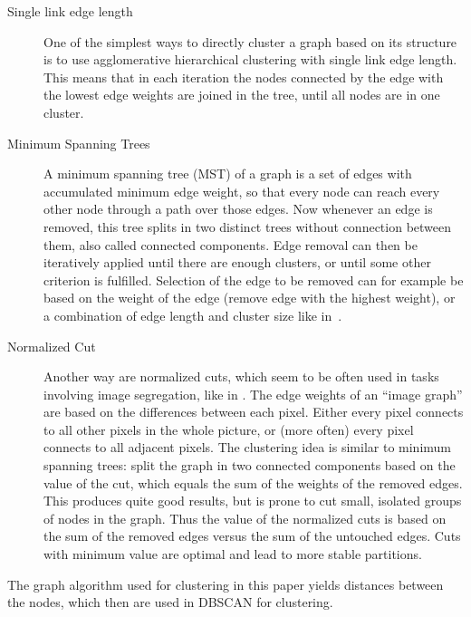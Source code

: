 \begin{description}
\item[Single link edge length] One of the simplest ways to directly cluster a graph based on its structure is to use agglomerative hierarchical clustering with single link edge length. This means that in each iteration the nodes connected by the edge with the lowest edge weights are joined in the tree, until all nodes are in one cluster.

\item[Minimum Spanning Trees]
A minimum spanning tree (MST) of a graph is a set of edges with accumulated minimum edge weight, so that every node can reach every other node through a path over those edges. Now whenever an edge is removed, this tree splits in two distinct trees without connection between them, also called connected components. Edge removal can then be iteratively applied until there are enough clusters, or until some other criterion is fulfilled. Selection of the edge to be removed can for example be based on the weight of the edge (remove edge with the highest weight), or a combination of edge length and cluster size like in~\cite{Muller2012}.

\item[Normalized Cut]
Another way are normalized cuts, which seem to be often used in tasks involving image segregation, like in \cite{Shi2000}. The edge weights of an \enquote{image graph} are based on the differences between each pixel. Either every pixel connects to all other pixels in the whole picture, or (more often) every pixel connects to all adjacent pixels. The clustering idea is similar to minimum spanning trees: split the graph in two connected components based on the value of the cut, which equals the sum of the weights of the removed edges. This produces quite good results, but is prone to cut small, isolated groups of nodes in the graph. Thus the value of the normalized cuts is based on the sum of the removed edges versus the sum of the untouched edges. Cuts with minimum value are optimal and lead to more stable partitions.
\end{description}
%
The graph algorithm used for clustering in this paper yields distances between the nodes, which then are used in DBSCAN for clustering.

